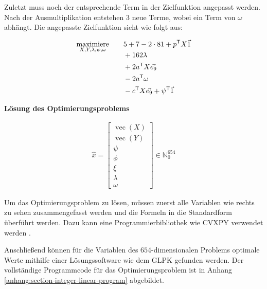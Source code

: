 \vspace*{-1.65cm}
\begin{addmargin}[1em]{0em}
    Zuletzt muss noch der entsprechende Term in der Zielfunktion angepasst werden. Nach der Ausmultiplikation entstehen 3 neue Terme, wobei ein Term von $\omega$ abhängt. Die angepasste Zielfunktion sieht wie folgt aus:
\end{addmargin}
\vspace*{-0.25cm}
\begin{align*}
    \smash{\displaystyle{\operatorname*{maximiere}_{X,Y,\lambda,\psi,\omega}}}\qquad & 5 +7 - 2 \cdot 81 + p^\mathsf{T}X\vec{1}  \\
    & + 162\lambda \\
    & + 2a^\mathsf{T}X\vec{e_9} \\
    & - 2a^\mathsf{T}\omega \\
    & - c^\mathsf{T}X\vec{e_9} + \psi^\mathsf{T}\vec{1}  \\
\end{align*}
\endgroup
\vspace*{-1.65cm}

\textbf{Lösung des Optimierungsproblems}

\begin{figure}
    \centering
    \vspace*{-0.985cm}
    \begin{align*}
        \hat{x} = \begin{bmatrix}
            \operatorname{vec}\left(X\right) \\[2pt]
            \operatorname{vec}\left(Y\right) \\[2pt]
            \psi \\[2pt]
            \phi \\[2pt]
            \xi \\[2pt]
            \lambda \\[2pt]
            \omega
        \end{bmatrix} \in \mathbb{N}_0^{654}
    \end{align*}
    \vspace*{-2cm}
\end{figure}

Um das Optimierungsproblem zu lösen, müssen zuerst alle Variablen wie rechts zu sehen zusammengefasst werden und die Formeln in die Standardform überführt werden. Dazu kann eine Programmierbibliothek wie CVXPY verwendet werden \cite{2016.CVXPY} \cite{2018.CVXPYRewrite}.

Anschließend können für die Variablen des $654$-dimensionalen Problems optimale Werte mithilfe einer Lösungssoftware wie dem \ac{GLPK} gefunden werden. Der vollständige Programmcode für das Optimierungsproblem ist in Anhang \ref{anhang:section-integer-linear-program} abgebildet.

